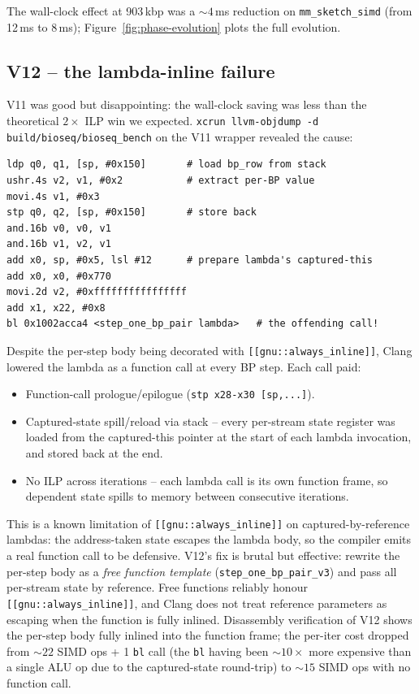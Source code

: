 The wall-clock effect at 903\,kbp was a $\sim 4$\,ms reduction on
\texttt{mm\_sketch\_simd} (from 12\,ms to 8\,ms);
Figure~\ref{fig:phase-evolution} plots the full evolution.

\subsection{V12 -- the lambda-inline failure}

V11 was good but disappointing: the wall-clock saving was less than
the theoretical $2\times$ ILP win we expected.
\texttt{xcrun llvm-objdump -d build/bioseq/bioseq\_bench} on the V11
wrapper revealed the cause:

\begin{verbatim}
ldp q0, q1, [sp, #0x150]       # load bp_row from stack
ushr.4s v2, v1, #0x2           # extract per-BP value
movi.4s v1, #0x3
stp q0, q2, [sp, #0x150]       # store back
and.16b v0, v0, v1
and.16b v1, v2, v1
add x0, sp, #0x5, lsl #12      # prepare lambda's captured-this
add x0, x0, #0x770
movi.2d v2, #0xffffffffffffffff
add x1, x22, #0x8
bl 0x1002acca4 <step_one_bp_pair lambda>   # the offending call!
\end{verbatim}

Despite the per-step body being decorated with
\texttt{[[gnu::always\_inline]]}, Clang lowered the lambda as a
function call at every BP step.  Each call paid:

\begin{itemize}
\item Function-call prologue/epilogue (\texttt{stp x28-x30 [sp,...]}).
\item Captured-state spill/reload via stack -- every per-stream
  state register was loaded from the captured-this pointer at
  the start of each lambda invocation, and stored back at the
  end.
\item No ILP across iterations -- each lambda call is its own
  function frame, so dependent state spills to memory between
  consecutive iterations.
\end{itemize}

This is a known limitation of \texttt{[[gnu::always\_inline]]} on
captured-by-reference lambdas: the address-taken state escapes the
lambda body, so the compiler emits a real function call to be
defensive.  V12's fix is brutal but effective: rewrite the per-step
body as a \emph{free function template}
(\texttt{step\_one\_bp\_pair\_v3}) and pass all per-stream state by
reference.  Free functions reliably honour
\texttt{[[gnu::always\_inline]]}, and Clang does not treat
reference parameters as escaping when the function is fully
inlined.  Disassembly verification of V12 shows the per-step body
fully inlined into the function frame; the per-iter cost dropped
from $\sim 22$ SIMD ops + 1 \texttt{bl} call (the \texttt{bl}
having been $\sim 10\times$ more expensive than a single ALU op due
to the captured-state round-trip) to $\sim 15$ SIMD ops with no
function call.

